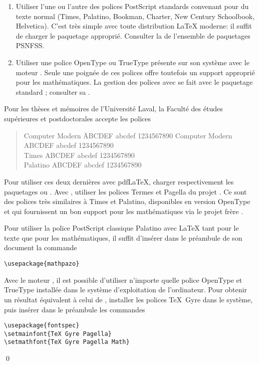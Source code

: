 \begin{enumerate}
\item Utiliser l'une ou l'autre des polices PostScript standards
  convenant pour du texte normal
  ({\Times Times}, %
   {\Palatino Palatino}, %
   {\Bookman Bookman}, %
   {\Charter Charter}, %
   {\NewCent New Century Schoolbook}, %
   {\Helvet Helvetica}). %
  C'est très simple avec toute distribution {\LaTeX} moderne: il
  suffit de charger le paquetage approprié. Consulter la %
  de l'ensemble de paquetages PSNFSS.
\item Utiliser une police OpenType ou TrueType présente sur son
  système avec le moteur {\XeLaTeX}. Seule une poignée de ces polices
  offre toutefois un support approprié pour les mathématiques. La
  gestion des polices avec {\XeLaTeX} se fait avec le paquetage
  standard ; consulter sa %
  .
\end{enumerate}

Pour les thèses et mémoires de l'Université Laval, la Faculté des
études supérieures et postdoctorales accepte les polices %
\begin{quote}
  \begin{tabbing}
    Computer Modern \qquad \=  ABCDEF abcdef 1234567890 \kill
    {\CM Computer Modern} \> {\CM ABCDEF abcdef 1234567890} \\
    {\Times Times} \> {\Times ABCDEF abcdef 1234567890} \\
    {\Palatino Palatino} \> {\Palatino ABCDEF abcdef 1234567890}
  \end{tabbing}
\end{quote}
Pour utiliser ces deux dernières avec pdf{\LaTeX}, charger
respectivement les paquetages  ou . Avec
{\XeLaTeX}, utiliser les polices Termes et Pagella du projet %
.
Ce sont des polices très similaires à Times et Palatino, disponibles
en version OpenType et qui fournissent un bon support pour les
mathématiques via le projet frère %
.

\begin{exemple}
  \label{ex:trucs:palatino}
  Pour utiliser la police PostScript classique Palatino avec {\LaTeX}
  tant pour le texte que pour les mathématiques, il suffit d'insérer
  dans le préambule de son document la commande
\begin{lstlisting}
\usepackage{mathpazo}
\end{lstlisting}

  Avec le moteur {\XeLaTeX}, il est possible d'utiliser n'importe
  quelle police OpenType et TrueType installée dans le système
  d'exploitation de l'ordinateur. Pour obtenir un résultat équivalent
  à celui de , installer les polices TeX~Gyre dans le
  système, puis insérer dans le préambule les commandes
\begin{lstlisting}
\usepackage{fontspec}
\setmainfont{TeX Gyre Pagella}
\setmathfont{TeX Gyre Pagella Math}
\end{lstlisting}
  \qed
\end{exemple}

